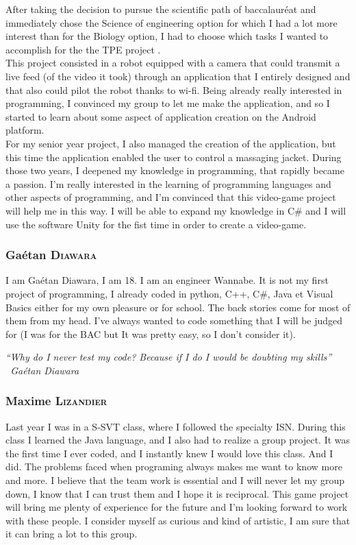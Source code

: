 \documentclass[12pt]{article}
\begin{document}
    After taking the decision to pursue the scientific path of baccalaur\'eat and immediately  chose the \guillemotleft \space Science of engineering \guillemotright \space option for which I had a lot more interest than for the \guillemotleft \space Biology \guillemotright \space option, I had to choose which tasks I wanted to accomplish for the the \guillemotleft \space TPE project \guillemotright.\\
This project consisted in a robot equipped with a camera that could transmit a live feed (of the video it took) through an application that I entirely designed and that also could pilot the robot thanks to wi-fi. Being already really interested in programming, I convinced my group to let me make the application, and so I started to learn about some aspect of application creation on the Android platform. \\
For my senior year project, I also managed the creation of the application, but this time the application enabled the user to control a massaging jacket.
During those two years, I deepened my knowledge in programming, that rapidly became a passion. I'm really interested in the learning of programming languages and other aspects of programming, and I'm convinced that this video-game project will help me in this way.
I will be able to expand my knowledge in C\# and I will use the software Unity for the fist time in order to create a video-game.


	\subsubsection{Ga\'etan \textsc{Diawara}}
    I am Ga\'etan Diawara, I am 18. I am an engineer Wannabe. It is not my first project of programming, I already coded in python, C++, C\#, Java et Visual Basics either for my own pleasure or for school. The back stories come for most of them from my head. I’ve always wanted to code something that I will be judged for (I was for the BAC but It was pretty easy, so I don’t consider it).

\begin{center}
\textmd{\textit{“Why do I never test my code? Because if I do I would be doubting my skills” \ Ga\'etan Diawara}}
\end{center}
    
    
    \subsubsection{Maxime \textsc{Lizandier}}
    Last year I was in a S-SVT class, where I followed the specialty ISN. During this class I learned the Java language, and I also had to realize a group project. It was the first time I ever coded, and I instantly knew I would love this class. And I did. The problems faced when programing always makes me want to know more and more. I believe that the team work is essential and I will never let my group down, I know that I can trust them and I hope it is reciprocal. This game project will bring me plenty of experience for the future and I'm looking forward to work with these people. I consider myself as curious and kind of artistic, I am sure that it can bring a lot to this group.
\end{document}
